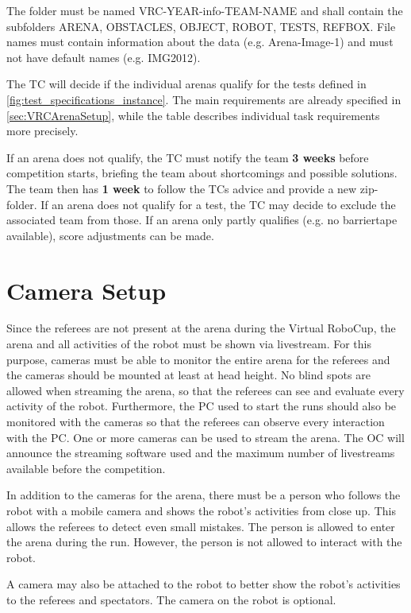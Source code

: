 The folder must be named VRC-YEAR-info-TEAM-NAME and shall contain the subfolders ARENA, OBSTACLES, OBJECT, ROBOT, TESTS, REFBOX. 
File names must contain information about the data (e.g. Arena-Image-1) and must not have default names (e.g. IMG2012).

The TC will decide if the individual arenas qualify for the tests defined in \ref{fig:test_specifications_instance}. 
The main requirements are already specified in \ref{sec:VRCArenaSetup}, while the table describes individual task requirements more precisely.
 
If an arena does not qualify, the TC must notify the team \textbf{3 weeks} before competition starts, 
briefing the team about shortcomings and possible solutions. 
The team then has \textbf{1 week} to follow the TCs advice and provide a new zip-folder.
If an arena does not qualify for a test, the TC may decide to exclude the associated team from those.
If an arena only partly qualifies (e.g. no barriertape available), score adjustments can be made.


\section{Camera Setup} 
\label{sec:VRCCameraSetup}

Since the referees are not present at the arena during the Virtual RoboCup, the arena and all activities of the robot must be shown via livestream. For this purpose, cameras must be able to monitor the entire arena for the referees and the cameras should be mounted at least at head height. No blind spots are allowed when streaming the arena, so that the referees can see and evaluate every activity of the robot. Furthermore, the PC used to start the runs should also be monitored with the cameras so that the referees can observe every interaction with the PC. One or more cameras can be used to stream the arena. The OC will announce the streaming software used and the maximum number of livestreams available before the competition.
\par
In addition to the cameras for the arena, there must be a person who follows the robot with a mobile camera and shows the robot's activities from close up. This allows the referees to detect even small mistakes. The person is allowed to enter the arena during the run. However, the person is not allowed to interact with the robot.
\par
A camera may also be attached to the robot to better show the robot's activities to the referees and spectators. The camera on the robot is optional.

